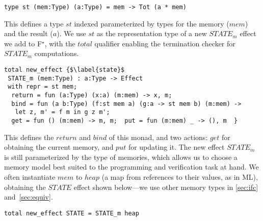 \documentclass[sigplan,screen]{acmart}\settopmatter{}
\newcommand\fstar{F$^\star$\xspace}
\newcommand{\comm}[3]{\ifcheckpagebudget\else\ifdraft{\maybecolor{#1}[#2: #3]}\fi\fi}
\newcommand{\ch}[1]{\comm{teal}{CH}{#1}}
\newcommand{\chfoot}[1]{\ifdraft\footnote{\comm{teal}{CH}{#1}}\fi}
\begin{document}
%
%
%
%
\begin{lstlisting}
type st (mem:Type) (a:Type) = mem -> Tot (a * mem)
\end{lstlisting}
%
This defines a type \ls$st$ \ifsubmit indexed \else parameterized \fi
by types for the memory (\ls$mem$) and the result (\ls$a$).
%
We use \ls$st$  as the representation type of a new \ls$STATE_m$ effect we
add to \fstar, with the \ls$total$ qualifier enabling the termination
checker for \ls$STATE_m$ computations.
%
\begin{lstlisting}
total new_effect {$\label{state}$
 STATE_m (mem:Type) : a:Type -> Effect
 with repr = st mem;
  return = fun (a:Type) (x:a) (m:mem) -> x, m;
  bind = fun (a b:Type) (f:st mem a) (g:a -> st mem b) (m:mem) -> 
   let z, m' = f m in g z m';
  get = fun () (m:mem) -> m, m;  put = fun (m:mem) _ -> (), m  }
\end{lstlisting}
%
This defines the \ls$return$ and \ls$bind$ of this monad,
and two actions: \ls$get$ for obtaining the current memory,
and \ls$put$ for updating it.
%
The new effect \ls$STATE_m$ is still parameterized by the type of memories,
which allows us to choose a memory model best suited to the programming
and verification task at hand. We often instantiate \ls$mem$
to \ls$heap$ (a map from references to their values, as in ML), obtaining
the \ls$STATE$ effect shown below---we use other memory types
in \autoref{sec:ifc} and~\autoref{sec:equiv}.
%
\begin{lstlisting}
total new_effect STATE = STATE_m heap
\end{lstlisting}
\end{document}
